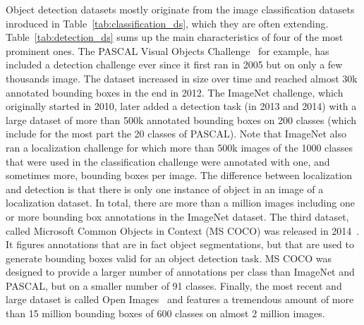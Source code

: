 Object detection datasets mostly originate from the image classification datasets
inroduced in Table~\ref{tab:classification_ds}, which they are often extending.
Table~\ref{tab:detection_ds} sums up the main characteristics
of four of the most prominent ones.
The PASCAL Visual Objects Challenge~\cite{Everingham10} for example,
has included a detection challenge ever
since it first ran in 2005 but on only a few thousands image.
The dataset increased in size over time and reached
almost 30k annotated bounding boxes in the end in 2012.
The ImageNet challenge, which originally started in 2010,
later added a detection task (in 2013 and 2014)
with a large dataset of more than 500k annotated bounding boxes
on 200 classes (which include for the most part the 20 classes of PASCAL).
Note that ImageNet also ran a localization challenge for which
more than 500k images of the 1000 classes that were used in
the classification challenge were annotated with one,
and sometimes more, bounding boxes per image.
The difference between localization and detection is that
there is only one instance of object in an image of a localization dataset.
In total, there are more than a million images
including one or more bounding box annotations in the ImageNet dataset.
The third dataset, called Microsoft Common Objects in Context (MS COCO)
was released in 2014~\cite{lin2014microsoft}.
It figures annotations that are in fact object segmentations,
but that are used to generate bounding boxes valid for an object detection task.
MS COCO was designed to provide a larger number of annotations
per class than ImageNet and PASCAL, but on a smaller number of 91 classes.
Finally, the most recent and large dataset is called
Open Images~\cite{OpenImages, OpenImages2} and features a tremendous amount
of more than 15 million bounding boxes of 600 classes on almost 2 million images.

